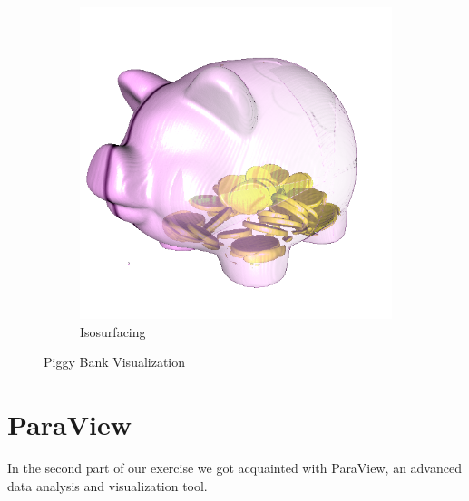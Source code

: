 \documentclass{article}
\begin{document}
\begin{figure}
\begin{subfigure}[h]{0.3\textwidth}
		\includegraphics[width=\textwidth]{pig-isolines.png}
		\caption{Isosurfacing}
		\label{fig:pigiso}
	\end{subfigure}
	\caption{Piggy Bank Visualization}\label{fig:6}
\end{figure}


\section{ParaView}
In the second part of our exercise we got acquainted with ParaView, an advanced data analysis and visualization tool.
\end{document}
